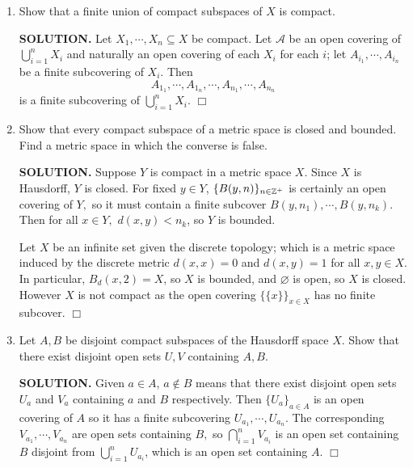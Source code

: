 \documentclass{article}
\begin{document}
\begin{enumerate}
\begin{enumerate}
        {\bf SOLUTION.} Define the open covering $\{A_n\}_{n \in \ints^+}$ of $[0, 1]$ by $A_n = [0, 1] - \{\frac1k: k \geq n\}.$ Suppose $A_1, \cdots, A_n$ is a finite subcovering; then for any $k \geq n,$ $\frac1k \notin \bigcup_{i=1}^n A_i.$ Thus there is no finte subcovering. $\Box$
    \end{enumerate}

    \item Show that a finite union of compact subspaces of $X$ is compact.

    {\bf SOLUTION.} Let $X_1, \cdots, X_n \subseteq X$ be compact. Let $\mathcal{A}$ be an open covering of $\bigcup_{i=1}^n X_i$ and naturally an open covering of each $X_i$ for each $i$; let $A_{i_1}, \cdots, A_{i_n}$ be a finite subcovering of $X_i.$ Then
    $$A_{1_1}, \cdots, A_{1_n}, \cdots, A_{n_1}, \cdots, A_{n_n}$$
    is a finite subcovering of $\bigcup_{i=1}^n X_i.$ $\Box$

    \item Show that every compact subspace of a metric space is closed and bounded. Find a metric space in which the converse is false.

    {\bf SOLUTION.} Suppose $Y$ is compact in a metric space $X.$ Since $X$ is Hausdorff, $Y$ is closed. For fixed $y \in Y$, $\{B(y, n)\}_{n \in \mathbb{Z}^+}$ is certainly an open covering of $Y,$ so it must contain a finite subcover $B(y, n_1), \cdots, B(y, n_k).$ Then for all $x \in Y,$ $d(x, y) < n_k$, so $Y$ is bounded.

    Let $X$ be an infinite set given the discrete topology; which is a metric space induced by the discrete metric $d(x, x) = 0$ and $d(x, y) = 1$ for all $x, y \in X.$ In particular, $B_d(x, 2) = X$, so $X$ is bounded, and $\varnothing$ is open, so $X$ is closed. However $X$ is not compact as the open covering $\{\{x\}\}_{x \in X}$ has no finite subcover. $\Box$

    \item Let $A, B$ be disjoint compact subspaces of the Hausdorff space $X$. Show that there exist disjoint open sets $U, V$ containing $A, B.$

    {\bf SOLUTION.} Given $a \in A$, $a \notin B$ means that there exist disjoint open sets $U_a$ and $V_a$ containing $a$ and $B$ respectively. Then $\{U_a\}_{a \in A}$ is an open covering of $A$ so it has a finite subcovering $U_{a_1}, \cdots, U_{a_n}$. The corresponding $V_{a_1}, \cdots, V_{a_n}$ are open sets containing $B,$ so $\bigcap_{i=1}^n V_{a_i}$ is an open set containing $B$ disjoint from $\bigcup_{i=1}^n U_{a_i}$, which is an open set containing $A.$ $\Box$


\end{enumerate}
\end{document}
